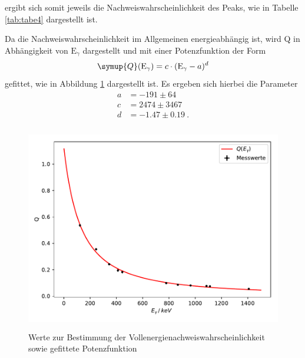 ergibt sich somit jeweils die Nachweiswahrscheinlichkeit des Peaks, wie in Tabelle
\ref{tab:tabe4} dargestellt ist.

Da die Nachweiswahrscheinlichkeit im Allgemeinen energieabhängig ist, wird Q in
Abhängigkeit von $ \text{E}_{\gamma} $ dargestellt und mit einer Potenzfunktion der Form
\begin{equation}
  \symup{Q}(\text{E}_{\gamma}) = c\cdot (\text{E}_{\gamma}-a)^{d}
  \label{eqn:ven2}
\end{equation}
gefittet, wie in Abbildung \ref{fig:plot4} dargestellt ist.
Es ergeben sich hierbei die Parameter
\begin{align*}
  a &= -191 \pm 64 \\
  c &= 2474 \pm 3467 \\
  d &= -1.47 \pm 0.19 \: .
\end{align*}
\begin{figure}
  \centering
  \includegraphics[height=9cm]{plot4.pdf}
  \caption{Werte zur Bestimmung der Vollenergienachweiswahrscheinlichkeit sowie gefittete Potenzfunktion}
  \label{fig:plot4}
\end{figure}

